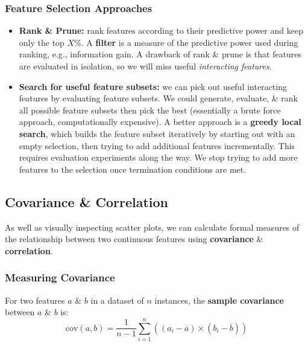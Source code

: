 \documentclass[a4paper,11pt]{article}
\begin{document}
\subsubsection{Feature Selection Approaches}
\begin{itemize}
    \item   \textbf{Rank \& Prune:} rank features according to their predictive power and keep only the top $X\%$.
            A \textbf{filter} is a measure of the predictive power used during ranking, e.g., information gain.
            A drawback of rank \& prune is that features are evaluated in isolation, so we will miss useful \textit{interacting features}.
    \item   \textbf{Search for useful feature subsets:}
            we can pick out useful interacting features by evaluating feature subsets.
            We could generate, evaluate, \& rank all possible feature subsets then pick the best (essentially a brute force approach, computationally expensive).
            A better approach is a \textbf{greedy local search}, which builds the feature subset iteratively by starting out with an empty selection, then trying to add additional features incrementally.
            This requires evaluation experiments along the way.
            We stop trying to add more features to the selection once termination conditions are met.
\end{itemize}

\subsection{Covariance \& Correlation}
As well as visually inspecting scatter plots, we can calculate formal measures of the relationship between two continuous features using \textbf{covariance} \& \textbf{correlation}.

\subsubsection{Measuring Covariance}
For two features $a$ \& $b$ in a dataset of $n$ instances, the \textbf{sample covariance} between $a$ \& $b$ is:
\[
    \text{cov}(a,b) = \frac{1}{n-1} \sum^n_{i=1} \left( \left( a_i - \overline{a} \right) \times \left( b_i - \overline{b} \right) \right)
\]
\end{document}
